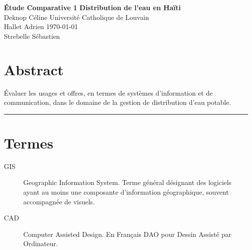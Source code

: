 \documentclass[a4paper, 11pt]{article}
\begin{document}
\noindent
\large\textbf{\'Etude Comparative 1} \hfill \textbf{Distribution de l'eau en Haïti} \\
\normalsize Deknop Céline \hfill Université Catholique de Louvain \\
Hallet Adrien \hfill \today \\
Strebelle Sébastien

\section*{Abstract}
\'Evaluer les usages et offres, en termes de systèmes d'information et de communication, dans le domaine de la gestion de distribution d'eau potable.

\hrule
\section*{Termes}
\begin{description}
    \item[GIS] Geographic Information System. Terme général désignant des logiciels ayant au moins une composante d'information géographique, souvent accompagnée de visuels.
    \item[CAD] Computer Assisted Design. En Français DAO pour Dessin Assisté par Ordinateur.
\end{description}
\end{document}

